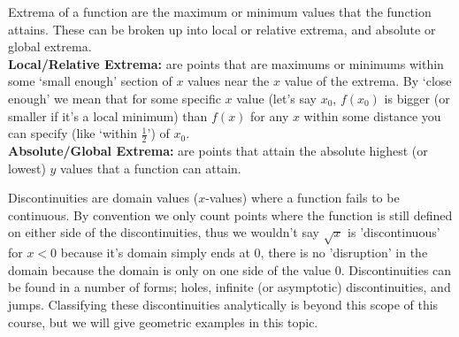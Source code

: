 \documentclass{ximeraXloud}
\begin{document}
\begin{definition}[Extrema]
    Extrema of a function are the maximum or minimum values that the function attains. These can be broken up into local or relative extrema, and absolute or global extrema.\\
    \textbf{Local/Relative Extrema:} are points that are maximums or minimums within some `small enough' section of $x$ values near the $x$ value of the extrema. By `close enough' we mean that for some specific $x$ value (let's say $x_0$, $f(x_0)$ is bigger (or smaller if it's a local minimum) than $f(x)$ for any $x$ within some distance you can specify (like `within $\frac{1}{2}$')  of $x_0$.\\
    \textbf{Absolute/Global Extrema:} are points that attain the absolute highest (or lowest) $y$ values that a function can attain.
\end{definition}

\begin{definition}[Discontinuities]
    Discontinuities are domain values ($x$-values) where a function fails to be continuous. By convention we only count points where the function is still defined on either side of the discontinuities, thus we wouldn't say $\sqrt{x}$ is 'discontinuous' for $x < 0$ because it's domain simply ends at 0, there is no 'disruption' in the domain because the domain is only on one side of the value 0. Discontinuities can be found in a number of forms; holes, infinite (or asymptotic) discontinuities, and jumps. Classifying these discontinuities analytically is beyond this scope of this course, but we will give geometric examples in this topic.
\end{definition}
\end{document}

